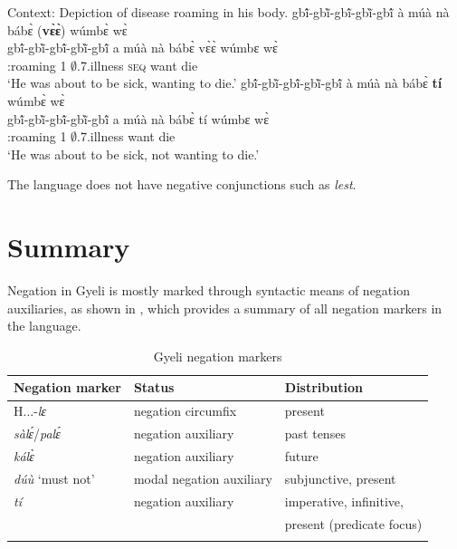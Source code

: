 \documentclass[output=paper,colorlinks=true, citecolor=brown,draftmode]{langscibook}
\begin{document}
\ea\label{tiSUB}Context: Depiction of disease roaming in his body.
\ea\label{tiSUBa} 
  \glll  gbĩ́-gbĩ̀-gbĩ́-gbĩ̀-gbĩ́   à múà nà bábɛ̀ {\ob}({\bfseries vɛ̀ɛ̀}) wúmbɛ̀ wɛ̀{\cb} \\
            gbĩ́-gbĩ̀-gbĩ́-gbĩ̀-gbĩ́  a múà nà bábɛ̀ {\db}vɛ̀ɛ̀ wúmbɛ wɛ̀   \\
         {\IDEO}:roaming 1 {\PROSP} {\COM} $\emptyset$.7.illness {\db}{\textsc{seq}} want die \\
    \trans `He was about to be sick, wanting to die.'
\ex\label{tiSUBb} 
  \glll  gbĩ́-gbĩ̀-gbĩ́-gbĩ̀-gbĩ́   à múà nà bábɛ̀ {\ob}{\bfseries tí} wúmbɛ̀ wɛ̀{\cb} \\
            gbĩ́-gbĩ̀-gbĩ́-gbĩ̀-gbĩ́  a múà nà bábɛ̀ {\db}tí wúmbɛ wɛ̀   \\
         {\IDEO}:roaming 1 {\PROSP} {\COM} $\emptyset$.7.illness {\db}{\NEG} want die \\
    \trans `He was about to be sick, not wanting to die.'
\z
\z

The language does not have negative conjunctions such as {\itshape lest}. 

\section{Summary}\label{sec:gye:5}

Negation in Gyeli is mostly marked through syntactic means of negation auxiliaries, as shown in , which provides a summary of all negation markers in the language. 


\begin{table}\small
\caption{Gyeli negation markers}
\label{tab:1:negmarkers}
\begin{tabularx}{\textwidth}{XXl}
  \lsptoprule
Negation marker & Status & Distribution \\
\midrule
H...-\textit{lɛ} &  negation circumfix & present \\
\textit{sàlɛ́}/\textit{palɛ́} &  negation auxiliary & past tenses  \\
\textit{kálɛ̀} & negation auxiliary & future \\
\textit{dúù} `must not' & modal negation auxiliary & subjunctive, present \\
\textit{tí} &  negation auxiliary & imperative, infinitive, \\
& & present (predicate focus) \\
  \lspbottomrule
\end{tabularx}
\end{table}
\end{document}
